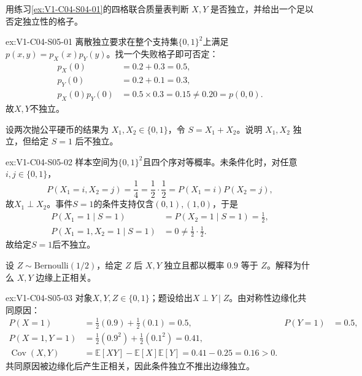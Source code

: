 \begin{SLChapterExercisePairSection}
\begin{exercise}\label{ex:V1-C04-S05-01}
用练习\ref{ex:V1-C04-S04-01}的四格联合质量表判断 $X,Y$ 是否独立，并给出一个足以否定独立性的格子。
\end{exercise}
\label{sol:V1-C04-S05-01}
\begin{chapterexercisesolution}{ex:V1-C04-S05-01}
离散独立要求在整个支持集$\{0,1\}^2$上满足$p(x,y)=p_X(x)p_Y(y)$。找一个失败格子即可否定：
\[
\begin{aligned}
p_X(0)&=0.2+0.3=0.5,\\
p_Y(0)&=0.2+0.1=0.3,\\
p_X(0)p_Y(0)&=0.5\times0.3=0.15
\ne0.20=p(0,0).
\end{aligned}
\]
故$X,Y$不独立。
\end{chapterexercisesolution}

\begin{exercise}\label{ex:V1-C04-S05-02}
设两次抛公平硬币的结果为 $X_1,X_2\in\{0,1\}$，令 $S=X_1+X_2$。说明 $X_1,X_2$ 独立，但给定 $S=1$ 后不独立。
\end{exercise}
\label{sol:V1-C04-S05-02}
\begin{chapterexercisesolution}{ex:V1-C04-S05-02}
样本空间为$\{0,1\}^2$且四个序对等概率。未条件化时，对任意$i,j\in\{0,1\}$，
\[
P(X_1=i,X_2=j)=\frac14
=\frac12\cdot\frac12=P(X_1=i)P(X_2=j),
\]
故$X_1\perp X_2$。事件$S=1$的条件支持仅含$(0,1),(1,0)$，于是
\[
\begin{aligned}
P(X_1=1\mid S=1)&=P(X_2=1\mid S=1)=\frac12,\\
P(X_1=1,X_2=1\mid S=1)&=0
\ne\frac12\cdot\frac12.
\end{aligned}
\]
故给定$S=1$后不独立。
\end{chapterexercisesolution}

\begin{exercise}\label{ex:V1-C04-S05-03}
设 $Z\sim\mathrm{Bernoulli}(1/2)$，给定 $Z$ 后 $X,Y$ 独立且都以概率 $0.9$ 等于 $Z$。解释为什么 $X,Y$ 边缘上正相关。
\end{exercise}
\label{sol:V1-C04-S05-03}
\begin{chapterexercisesolution}{ex:V1-C04-S05-03}
对象$X,Y,Z\in\{0,1\}$；题设给出$X\perp Y\mid Z$。由对称性边缘化共同原因：
\[
\begin{aligned}
P(X=1)&=\tfrac12(0.9)+\tfrac12(0.1)=0.5,
&P(Y=1)&=0.5,\\
P(X=1,Y=1)
&=\tfrac12(0.9^2)+\tfrac12(0.1^2)=0.41,\\
\operatorname{Cov}(X,Y)
&=\mathbb E[XY]-\mathbb E[X]\mathbb E[Y]
=0.41-0.25=0.16>0.
\end{aligned}
\]
共同原因被边缘化后产生正相关，因此条件独立不推出边缘独立。
\end{chapterexercisesolution}


\end{SLChapterExercisePairSection}
